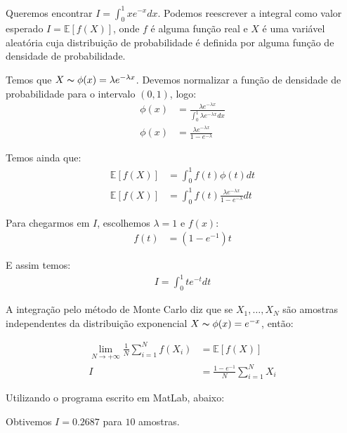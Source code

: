\documentclass[12pt]{article}
\newenvironment{exercise}[2][Exercício]{\begin{trivlist}
\item[\hskip \labelsep {\bfseries #1}\hskip \labelsep {\bfseries #2.}]}{\end{trivlist}}
\begin{document}
\begin{exercise}{1.c}
Queremos encontrar $I = \int_{0}^{1} xe^{-x} dx$. Podemos reescrever a integral
como valor esperado $I = \mathbb{E}[f(X)]$, onde $f$ é alguma função real e $X$
é uma variável aleatória cuja distribuição de probabilidade é definida por
alguma função de densidade de probabilidade.

Temos que $X \thicksim \phi(x) = \lambda e^{-\lambda x} $. Devemos
normalizar a função de densidade de probabilidade para o intervalo $(0,1)$,
logo:
\begin{align*}
\phi(x) &=  \frac{\lambda e^{-\lambda x}}{\int_0^1 \lambda e^{-\lambda x} dx} \\
\phi(x) &=  \frac{\lambda e^{-\lambda x}}{1-e^{-\lambda}}
\end{align*}

Temos ainda que:
\begin{align*}
\mathbb{E}[f(X)] &= \int_0^1 f(t)\phi(t) dt \\
\mathbb{E}[f(X)] &= \int_0^1 f(t)\frac{\lambda e^{-\lambda x}}{1-e^{-\lambda}} dt
\end{align*}

Para chegarmos em $I$, escolhemos $\lambda = 1$ e $f(x)$:
\begin{align*}
f(t) &= (1-e^{-1})t
\end{align*} 
  
E assim temos:
\begin{align*}
I = \int_{0}^{1} te^{-t} dt
\end{align*}

A integração pelo método de Monte Carlo diz que se $X_1, \ldots, X_N$ são
amostras independentes da distribuição exponencial $X \thicksim \phi(x) = e^{-x}
$, então:

\begin{align*}
\lim_{N\rightarrow +\infty} \frac{1}{N} \sum_{i=1}^{N} f(X_i) &=
\mathbb{E}[f(X)] \\
I &= \frac{1-e^{-1}}{N} \sum_{i=1}^{N} X_i
\end{align*}

Utilizando o programa escrito em MatLab, abaixo:


Obtivemos $I = 0.2687$ para $10$ amostras. 

\end{exercise}
\end{document}
